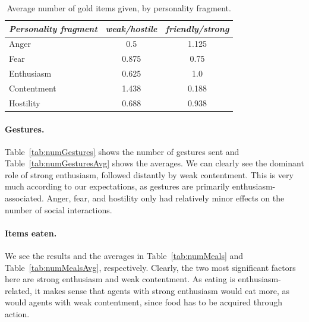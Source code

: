 \begin{table}
	\centering
	\begin{tabular}{ l | c | c }
		\emph{Personality fragment} & \emph{weak/hostile} & \emph{friendly/strong} \\
		\hline
		Anger & 0.5 & 1.125\\
		Fear & 0.875 & 0.75\\
		Enthusiasm & 0.625 & 1.0\\
		Contentment & 1.438 & 0.188\\
		Hostility & 0.688 & 0.938\\
		\hline
	\end{tabular}
	\caption{Average number of gold items given, by personality fragment.}
	\label{tab:numGoldGivenAvg}
\end{table}

\paragraph{Gestures.} Table~\ref{tab:numGestures} shows the number of gestures sent and Table~\ref{tab:numGesturesAvg} shows the averages. We can clearly see the dominant role of strong enthusiasm, followed distantly by weak contentment. This is very much according to our expectations, as gestures are primarily enthusiasm-associated. Anger, fear, and hostility only had relatively minor effects on the number of social interactions.
	
\paragraph{Items eaten.} We see the results and the averages in Table~\ref{tab:numMeals} and Table~\ref{tab:numMealsAvg}, respectively. Clearly, the two most significant factors here are strong enthusiasm and weak contentment. As eating is enthusiasm-related, it makes sense that agents with strong enthusiasm would eat more, as would agents with weak contentment, since food has to be acquired through action.
	

